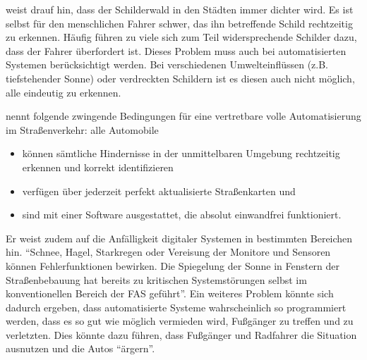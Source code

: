 \Textcite[S. 55]{Bremer.2004} weist drauf hin, dass der Schilderwald in den Städten immer dichter wird. Es ist selbst für den menschlichen Fahrer schwer, das ihn betreffende Schild rechtzeitig zu erkennen. Häufig führen zu viele sich zum Teil widersprechende Schilder dazu, dass der Fahrer überfordert ist. Dieses Problem muss auch bei automatisierten Systemen berücksichtigt werden. Bei verschiedenen Umwelteinflüssen (z.B. tiefstehender Sonne) oder verdreckten Schildern ist es diesen auch nicht möglich, alle eindeutig zu erkennen. 

\Textcite[S. 639]{Kossak.2017} nennt folgende  zwingende Bedingungen für eine vertretbare volle Automatisierung im Straßenverkehr: alle Automobile
\begin{itemize}
	\item können sämtliche Hindernisse in der unmittelbaren Umgebung rechtzeitig erkennen und korrekt identifizieren
	\item verfügen über jederzeit perfekt aktualisierte Straßenkarten und
	\item sind mit einer Software ausgestattet, die absolut einwandfrei funktioniert.
\end{itemize}

Er weist zudem auf die Anfälligkeit digitaler Systemen in bestimmten Bereichen hin. \enquote{Schnee, Hagel, Starkregen oder Vereisung der Monitore und Sensoren können Fehlerfunktionen bewirken. Die Spiegelung der Sonne in Fenstern der Straßenbebauung hat bereits zu kritischen Systemstörungen selbst im konventionellen Bereich der FAS geführt}. Ein weiteres Problem könnte sich dadurch ergeben, dass automatisierte Systeme wahrscheinlich so programmiert werden, dass es so gut wie möglich vermieden wird, Fußgänger zu treffen und zu verletzten. Dies könnte dazu führen, dass Fußgänger und Radfahrer die Situation ausnutzen und die Autos \enquote{ärgern}. 
